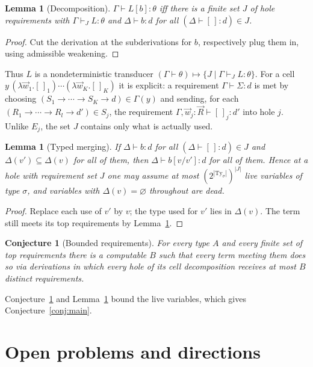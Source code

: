 \documentclass[11pt]{article}
\newcommand{\hole}[1]{[\,]_{#1}}
\newcommand{\mcell}{\Sigma}
\newcommand{\Ty}{\mathrm{Ty}}
\newtheorem{lemma}[theorem]{Lemma}
\newtheorem{conjecture}[theorem]{Conjecture}
\theoremstyle{definition}
\begin{document}
\begin{lemma}[Decomposition]\label{lem:decomp}
$\Gamma\vdash L[b]:\theta$ iff there is a finite set $J$ of hole
requirements with $\Gamma\vdash_J L:\theta$ and $\Delta\vdash b:d$ for all
$(\Delta\vdash\hole{}:d)\in J$.
\end{lemma}
\begin{proof}
Cut the derivation at the subderivations for $b$, respectively plug them
in, using admissible weakening.
\end{proof}

Thus $L$ is a nondeterministic transducer
$(\Gamma\vdash\theta)\mapsto\{J\mid\Gamma\vdash_J L:\theta\}$.  For a cell
$y\,(\lambda\vec w_1.\hole1)\cdots(\lambda\vec w_K.\hole K)$ it is explicit:
a requirement $\Gamma\vdash\mcell:d$ is met by choosing
$(S_1\to\cdots\to S_K\to d)\in\Gamma(y)$ and sending, for each
$(R_1\to\cdots\to R_l\to d')\in S_j$, the requirement
$\Gamma,\vec w_j:\vec R\vdash\hole j:d'$ into hole $j$.  Unlike $E_j$,
the set $J$ contains only what is actually used.

\begin{lemma}[Typed merging]\label{lem:typed-merge}
If $\Delta\vdash b:d$ for all $(\Delta\vdash\hole{}:d)\in J$ and
$\Delta(v')\subseteq\Delta(v)$ for all of them, then
$\Delta\vdash b[v/v']:d$ for all of them.  Hence at a hole with
requirement set $J$ one may assume at most
$(2^{|\Ty_\sigma|})^{|J|}$ live variables of type $\sigma$, and variables
with $\Delta(v)=\varnothing$ throughout are dead.
\end{lemma}
\begin{proof}
Replace each use of $v'$ by $v$; the type used for $v'$ lies in
$\Delta(v)$.  The term still meets its top requirements by
Lemma~\ref{lem:decomp}.
\end{proof}

\begin{conjecture}[Bounded requirements]\label{conj:req}
For every type $A$ and every finite set of top requirements there is a
computable $B$ such that every term meeting them does so via derivations
in which every hole of its cell decomposition receives at most $B$
distinct requirements.
\end{conjecture}

Conjecture~\ref{conj:req} and Lemma~\ref{lem:typed-merge} bound the live
variables, which gives Conjecture~\ref{conj:main}.

\section{Open problems and directions}\label{sec:open}
\end{document}

